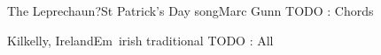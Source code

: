 \begin{song}{The Leprechaun}{?}{St Patrick's Day song}{Marc Gunn}{}{}
TODO : Chords
	
\end{song}

\begin{song}{Kilkelly, Ireland}{Em}{~}{irish traditional}{}{}
TODO : All
\end{song}
